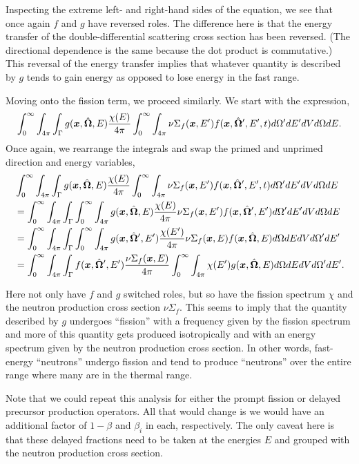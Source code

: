 Inspecting the extreme left- and right-hand sides of the equation, we see that once again $f$ and $g$ have reversed roles. The difference here is that the energy transfer of the double-differential scattering cross section has been reversed. (The directional dependence is the same because the dot product is commutative.) This reversal of the energy transfer implies that whatever quantity is described by $g$ tends to gain energy as opposed to lose energy in the fast range.

Moving onto the fission term, we proceed similarly. We start with the expression,
\begin{align}
  \int_0^\infty \int_{4\pi} \int_\Gamma g(\bm{x},\hat{\mathbf{\Omega}},E) \frac{\chi(E)}{4\pi} \int_0^\infty \int_{4\pi} \nu \Sigma_f(\bm{x}, E') f(\bm{x},\hat{\mathbf{\Omega}}',E',t) d\Omega' dE' dV d\Omega dE . \nonumber
\end{align}
Once again, we rearrange the integrals and swap the primed and unprimed direction and energy variables,
\begin{align}
  &\int_0^\infty \int_{4\pi} \int_\Gamma g(\bm{x},\hat{\mathbf{\Omega}},E) \frac{\chi(E)}{4\pi} \int_0^\infty \int_{4\pi} \nu \Sigma_f(\bm{x}, E') f(\bm{x},\hat{\mathbf{\Omega}}',E',t) d\Omega' dE' dV d\Omega dE \nonumber \\
  &= \int_0^\infty \int_{4\pi} \int_\Gamma \int_0^\infty \int_{4\pi}  g(\bm{x},\hat{\mathbf{\Omega}},E) \frac{\chi(E)}{4\pi} \nu \Sigma_f(\bm{x}, E') f(\bm{x},\hat{\mathbf{\Omega}}',E') d\Omega' dE' dV d\Omega dE \nonumber \\
  &= \int_0^\infty \int_{4\pi} \int_\Gamma \int_0^\infty \int_{4\pi}  g(\bm{x},\hat{\mathbf{\Omega}}',E') \frac{\chi(E')}{4\pi} \nu \Sigma_f(\bm{x}, E) f(\bm{x},\hat{\mathbf{\Omega}},E) d\Omega dE dV d\Omega' dE' \nonumber \\
  &= \int_0^\infty \int_{4\pi} \int_\Gamma  f(\bm{x},\hat{\mathbf{\Omega}}',E')  \frac{\nu \Sigma_f(\bm{x}, E)}{4\pi} \int_0^\infty \int_{4\pi}  \chi(E')  g(\bm{x},\hat{\mathbf{\Omega}},E) d\Omega dE dV d\Omega' dE' .
\end{align}

Here not only have $f$ and $g$ switched roles, but so have the fission spectrum $\chi$ and the neutron production cross section $\nu\Sigma_f$. This seems to imply that the quantity described by $g$ undergoes ``fission'' with a frequency given by the fission spectrum and more of this quantity gets produced isotropically and with an energy spectrum given by the neutron production cross section. In other words, fast-energy ``neutrons'' undergo fission and tend to produce ``neutrons'' over the entire range where many are in the thermal range. 

Note that we could repeat this analysis for either the prompt fission or delayed precursor production operators. All that would change is we would have an additional factor of $1 - \beta$ and $\beta_i$ in each, respectively. The only caveat here is that these delayed fractions need to be taken at the energies $E$ and grouped with the neutron production cross section.

